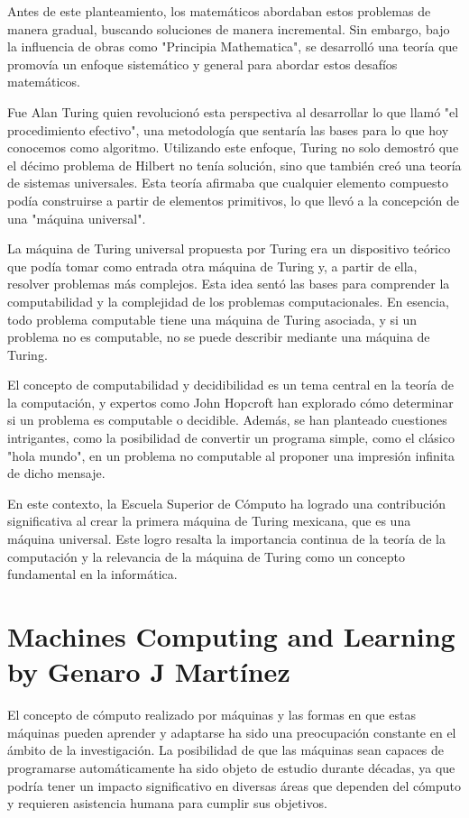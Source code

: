 \documentclass[12pt]{article} %
\begin{document}
	Antes de este planteamiento, los matemáticos abordaban estos problemas de manera gradual, buscando soluciones de manera incremental. Sin embargo, bajo la influencia de obras como "Principia Mathematica", se desarrolló una teoría que promovía un enfoque sistemático y general para abordar estos desafíos matemáticos.
	
	Fue Alan Turing quien revolucionó esta perspectiva al desarrollar lo que llamó "el procedimiento efectivo", una metodología que sentaría las bases para lo que hoy conocemos como algoritmo. Utilizando este enfoque, Turing no solo demostró que el décimo problema de Hilbert no tenía solución, sino que también creó una teoría de sistemas universales. Esta teoría afirmaba que cualquier elemento compuesto podía construirse a partir de elementos primitivos, lo que llevó a la concepción de una "máquina universal".
	
	La máquina de Turing universal propuesta por Turing era un dispositivo teórico que podía tomar como entrada otra máquina de Turing y, a partir de ella, resolver problemas más complejos. Esta idea sentó las bases para comprender la computabilidad y la complejidad de los problemas computacionales. En esencia, todo problema computable tiene una máquina de Turing asociada, y si un problema no es computable, no se puede describir mediante una máquina de Turing.
	
	El concepto de computabilidad y decidibilidad es un tema central en la teoría de la computación, y expertos como John Hopcroft han explorado cómo determinar si un problema es computable o decidible. Además, se han planteado cuestiones intrigantes, como la posibilidad de convertir un programa simple, como el clásico "hola mundo", en un problema no computable al proponer una impresión infinita de dicho mensaje.
	
	En este contexto, la Escuela Superior de Cómputo ha logrado una contribución significativa al crear la primera máquina de Turing mexicana, que es una máquina universal. Este logro resalta la importancia continua de la teoría de la computación y la relevancia de la máquina de Turing como un concepto fundamental en la informática.
	
	
	\section{Machines Computing and Learning by Genaro J Martínez}
	
	El concepto de cómputo realizado por máquinas y las formas en que estas máquinas pueden aprender y adaptarse ha sido una preocupación constante en el ámbito de la investigación. La posibilidad de que las máquinas sean capaces de programarse automáticamente ha sido objeto de estudio durante décadas, ya que podría tener un impacto significativo en diversas áreas que dependen del cómputo y requieren asistencia humana para cumplir sus objetivos.
	
\end{document}

